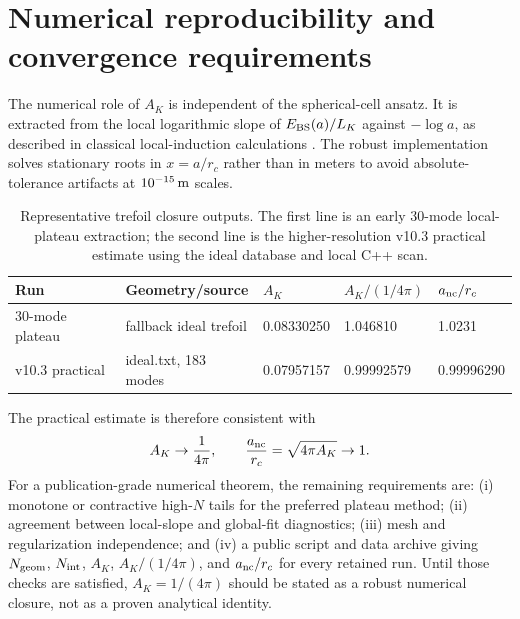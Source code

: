 \documentclass[aps,pra,preprint,longbibliography,nofootinbib]{revtex4-2}
\begin{document}
\section{Numerical reproducibility and convergence requirements}
\label{app:numerics}

The numerical role of $A_K$ is independent of the spherical-cell ansatz.  It
is extracted from the local logarithmic slope of $E_{\rm BS}(a)/L_K$ against
$-\log a$, as described in classical local-induction calculations
\cite{Saffman1992}.  The robust implementation solves stationary roots in
$x=a/r_c$ rather than in meters to avoid absolute-tolerance artifacts at
$10^{-15}\,{\rm m}$ scales.

\begin{table}[h]
\centering
\caption{Representative trefoil closure outputs.  The first line is an early
30-mode local-plateau extraction; the second line is the higher-resolution
v10.3 practical estimate using the ideal database and local C++ scan.}
\label{tab:app_numerics}
\begin{tabular}{lllll}
\toprule
Run & Geometry/source & $A_K$ & $A_K/(1/4\pi)$ & $a_{\rm nc}/r_c$ \\
\midrule
30-mode plateau & fallback ideal trefoil & 0.08330250 & 1.046810 & 1.0231 \\
v10.3 practical & ideal.txt, 183 modes & 0.07957157 & 0.99992579 & 0.99996290 \\
\bottomrule
\end{tabular}
\end{table}

The practical estimate is therefore consistent with
\begin{equation}
  A_K\to\frac{1}{4\pi},
  \qquad
  \frac{a_{\rm nc}}{r_c}=\sqrt{4\pi A_K}\to1 .
  \label{eq:app_AK_limit}
\end{equation}
For a publication-grade numerical theorem, the remaining requirements are:
(i) monotone or contractive high-$N$ tails for the preferred plateau method;
(ii) agreement between local-slope and global-fit diagnostics; (iii) mesh and
regularization independence; and (iv) a public script and data archive giving
$N_{\rm geom}$, $N_{\rm int}$, $A_K$, $A_K/(1/4\pi)$, and
$a_{\rm nc}/r_c$ for every retained run.  Until those checks are satisfied,
$A_K=1/(4\pi)$ should be stated as a robust numerical closure, not as a
proven analytical identity.
\end{document}
